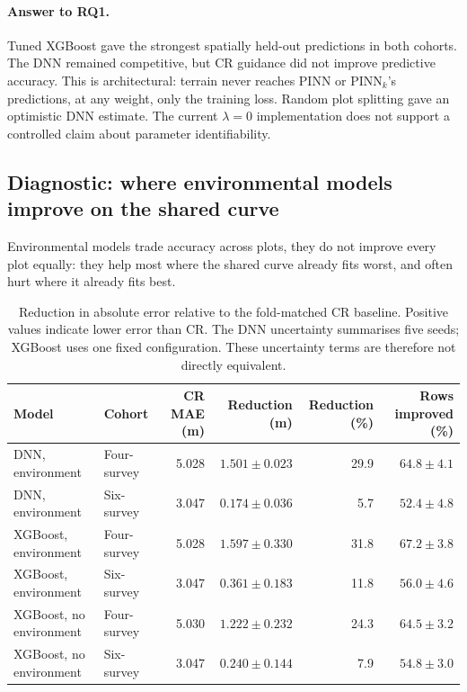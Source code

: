 
\paragraph*{Answer to RQ1.}
Tuned XGBoost gave the strongest spatially held-out predictions in both cohorts. The DNN remained
competitive, but CR guidance did not improve predictive accuracy. This is architectural: terrain
never reaches PINN or PINN$_k$'s predictions, at any weight, only the training loss. Random plot
splitting gave an optimistic DNN estimate. The current $\lambda=0$ implementation does not support
a controlled claim about parameter identifiability.


\subsection{Diagnostic: where environmental models improve on the shared curve}
\label{sec:results-rq1-cr-reduction}

Environmental models trade accuracy across plots, they do not improve every plot equally: they
help most where the shared curve already fits worst, and often hurt where it already fits best.

\begin{table}[!htbp]
\centering
\scriptsize
\renewcommand{\arraystretch}{1.1}
\begin{tabular}{llrrrr}
\toprule
Model & Cohort & CR MAE (m) & Reduction (m) & Reduction (\%) & Rows improved (\%) \\
\midrule
DNN, environment & Four-survey & 5.028 & $1.501\pm0.023$ & 29.9 & $64.8\pm4.1$ \\
DNN, environment & Six-survey & 3.047 & $0.174\pm0.036$ & 5.7 & $52.4\pm4.8$ \\
XGBoost, environment & Four-survey & 5.028 & $1.597\pm0.330$ & 31.8 & $67.2\pm3.8$ \\
XGBoost, environment & Six-survey & 3.047 & $0.361\pm0.183$ & 11.8 & $56.0\pm4.6$ \\
XGBoost, no environment & Four-survey & 5.030 & $1.222\pm0.232$ & 24.3 & $64.5\pm3.2$ \\
XGBoost, no environment & Six-survey & 3.047 & $0.240\pm0.144$ & 7.9 & $54.8\pm3.0$ \\
\bottomrule
\end{tabular}
\caption{Reduction in absolute error relative to the fold-matched CR baseline. Positive values
indicate lower error than CR. The DNN uncertainty summarises five seeds; XGBoost uses one fixed
configuration. These uncertainty terms are therefore not directly equivalent.}
\label{tab:results-cr-reduction}
\end{table}

